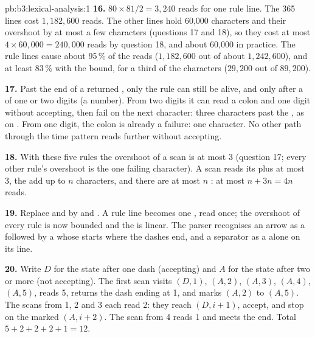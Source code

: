 \begin{solution}{pb:b3:lexical-analysis:1}
\textbf{16.} $80 \times 81 / 2 = 3{,}240$ reads for one rule line. The 365 lines cost $1{,}182{,}600$ reads. The other lines hold 60,000 characters and their  overshoot by at most a few characters (questions 17 and 18), so they cost at most $4 \times 60{,}000 = 240{,}000$ reads by question 18, and about 60,000 in practice. The rule lines cause about 95\,\% of the reads ($1{,}182{,}600$ out of about $1{,}242{,}600$), and at least 83\,\% with the bound, for a third of the characters ($29{,}200$ out of $89{,}200$).

\textbf{17.} Past the end of a returned , only the  rule can still be alive, and only after a  of one or two digits (a number). From two digits it can read a colon and one digit without accepting, then fail on the next character: three characters past the , as on . From one digit, the colon is already a failure: one character. No other path through the time pattern reads further without accepting.

\textbf{18.} With these five rules the overshoot of a scan is at most 3 (question 17; every other rule's overshoot is the one failing character). A scan reads its  plus at most 3, the  add up to $n$ characters, and there are at most $n$ : at most $n + 3n = 4n$ reads.

\textbf{19.} Replace  and  by  \code{-+} and  \code{>}. A rule line becomes one  , read once; the overshoot of every rule is now bounded and the  is linear. The parser recognises an arrow as a   followed by a   whose  starts where the dashes end, and a separator as a   alone on its line.

\textbf{20.} Write $D$ for the state after one dash (accepting) and $A$ for the state after two or more (not accepting). The first scan visits $(D,1)$, $(A,2)$, $(A,3)$, $(A,4)$, $(A,5)$, reads 5, returns the dash ending at 1, and marks $(A,2)$ to $(A,5)$. The scans from 1, 2 and 3 each read 2: they reach $(D, i+1)$, accept, and stop on the marked $(A, i+2)$. The scan from 4 reads 1 and meets the end. Total $5 + 2 + 2 + 2 + 1 = 12$.


\end{solution}
